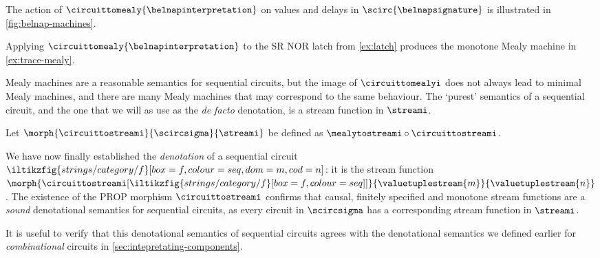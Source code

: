 \begin{example}
    The action of \(\circuittomealy{\belnapinterpretation}\) on values and
    delays in \(\scirc{\belnapsignature}\) is illustrated in
    \cref{fig:belnap-machines}.
\end{example}



\begin{example}\label{ex:mealy-translation}
    Applying \(\circuittomealy{\belnapinterpretation}\) to the SR NOR latch from
    \cref{ex:latch} produces the monotone Mealy machine in
    \cref{ex:trace-mealy}.
\end{example}

Mealy machines are a reasonable semantics for sequential circuits, but the
image of \(\circuittomealyi\) does not always lead to minimal Mealy machines,
and there are many Mealy machines that may correspond to the same behaviour.
The `purest' semantics of a sequential circuit, and the one that we will as use
as the \emph{de facto} denotation, is a stream function in \(\streami\).

\begin{definition}
    Let \(\morph{\circuittostreami}{\scircsigma}{\streami}\) be defined as
    \(\mealytostreami \circ \circuittostreami\).
\end{definition}

We have now finally established the \emph{denotation} of a sequential circuit \(
\iltikzfig{strings/category/f}[box=f,colour=seq,dom=m,cod=n]
\): it is the stream function \(
\morph{\circuittostreami[\iltikzfig{strings/category/f}[box=f,colour=seq]]}{\valuetuplestream{m}}{\valuetuplestream{n}}
\).
The existence of the PROP morphism \(\circuittostreami\) confirms that causal,
finitely specified and monotone stream functions are a \emph{sound} denotational
semantics for sequential circuits, as every circuit in \(\scircsigma\) has a
corresponding stream function in \(\streami\).

It is useful to verify that this denotational semantics of sequential circuits
agrees with the denotational semantics we defined earlier for
\emph{combinational} circuits in \cref{sec:intepretating-components}.

